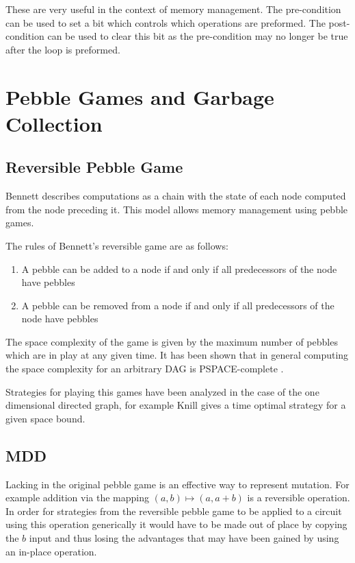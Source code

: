 These are very useful in the context of memory management. The pre-condition can
be used to set a bit which controls which operations are preformed. The
post-condition can be used to clear this bit as the pre-condition may no longer
be true after the loop is preformed.


\section{Pebble Games and Garbage Collection}

\subsection{Reversible Pebble Game}
Bennett\cite{Bennett:89} describes computations as a chain with the state of
each node computed from the node preceding it. This model allows memory
management using pebble games.

The rules of Bennett's reversible game are as follows:

\begin{enumerate}

  \item A pebble can be added to a node if and only if all predecessors of the
    node have pebbles

  \item A pebble can be removed from a node if and only if all predecessors of
    the node have pebbles

\end{enumerate}

The space complexity of the game is given by the maximum number of pebbles which
are in play at any given time. It has been shown that in general computing the
space complexity for an arbitrary DAG is PSPACE-complete \cite{chan13}.

Strategies for playing this games have been analyzed in the case of the one
dimensional directed graph, for example Knill \cite{knill:95} gives a time
optimal strategy for a given space bound.

\subsection{MDD}

Lacking in the original pebble game is an effective way to represent mutation.
For example addition via the mapping $(a,b) \mapsto (a,a+b)$ is a reversible
operation. In order for strategies from the reversible pebble game to be applied
to a circuit using this operation generically it would have to be made out of
place by copying the $b$ input and thus losing the advantages that may have been
gained by using an in-place operation.

